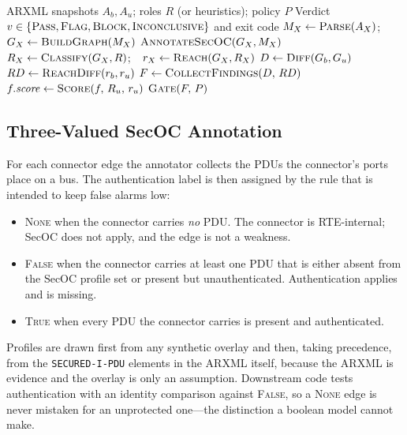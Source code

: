 \documentclass[journal]{IEEEtran}
\begin{document}
\begin{algorithm}[t]
\caption{Security-Regression Analysis}
\label{alg:main}
\begin{algorithmic}[1]
\Require ARXML snapshots $A_{b},A_{u}$; roles $R$ (or heuristics); policy $P$
\Ensure Verdict $v\in\{\textsc{Pass},\textsc{Flag},\textsc{Block},\textsc{Inconclusive}\}$ and exit code
  \State $M_X \gets \Call{Parse}{A_X}$;\ \ $G_X \gets \Call{BuildGraph}{M_X}$
  \State $\Call{AnnotateSecOC}{G_X, M_X}$
  \State $R_X \gets \Call{Classify}{G_X, R}$;\ \ $r_X \gets \Call{Reach}{G_X,R_X}$
\EndFor
\State $D \gets \Call{Diff}{G_b,G_u}$ 
\State $RD \gets \Call{ReachDiff}{r_b,r_u}$ 
\State $F \gets \Call{CollectFindings}{D,\,RD}$
  \State $f.\mathit{score} \gets \Call{Score}{f,\,R_u,\,r_u}$ 
\EndFor
\State \Return $\Call{Gate}{F,\,P}$
\end{algorithmic}
\end{algorithm}

\subsection{Three-Valued SecOC Annotation}
\label{subsec:secoc}
For each connector edge the annotator collects the PDUs the connector's ports
place on a bus. The authentication label is then assigned by the rule that is
intended to keep false alarms low:
\begin{itemize}
\item \textsc{None} when the connector carries \emph{no} PDU. The connector is
RTE-internal; SecOC does not apply, and the edge is not a weakness.
\item \textsc{False} when the connector carries at least one PDU that is either
absent from the SecOC profile set or present but unauthenticated. Authentication
applies and is missing.
\item \textsc{True} when every PDU the connector carries is present and
authenticated.
\end{itemize}
Profiles are drawn first from any synthetic overlay and then, taking precedence,
from the \texttt{SECURED-I-PDU} elements in the ARXML itself, because the ARXML
is evidence and the overlay is only an assumption. Downstream code tests
authentication with an identity comparison against \textsc{False}, so a
\textsc{None} edge is never mistaken for an unprotected one---the distinction a
boolean model cannot make.
\end{document}
